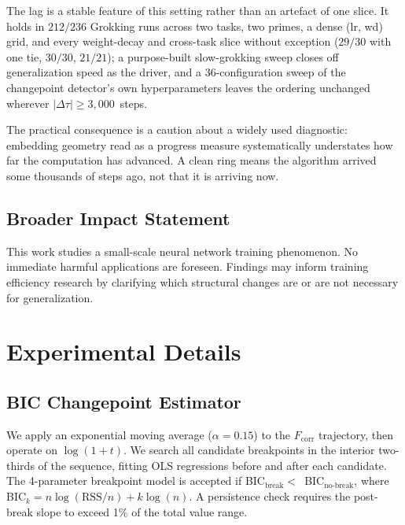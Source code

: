 \documentclass{article}
\newcommand{\Dtau}{\Delta\tau}
\newcommand{\fcorr}{F_{\mathrm{corr}}}
\begin{document}
The lag is a stable feature of this setting rather than an
artefact of one slice.
It holds in $212/236$ Grokking runs across two tasks, two primes,
a dense (lr, wd) grid, and every weight-decay and cross-task
slice without exception ($29/30$ with one tie, $30/30$, $21/21$);
a purpose-built slow-grokking sweep closes off generalization
speed as the driver, and a 36-configuration sweep of the
changepoint detector's own hyperparameters leaves the ordering
unchanged wherever $|\Dtau|\geq3{,}000$~steps.

The practical consequence is a caution about a widely used
diagnostic: embedding geometry read as a progress measure
systematically understates how far the computation has advanced.
A clean ring means the algorithm arrived some thousands of steps
ago, not that it is arriving now.

\subsection*{Broader Impact Statement}

This work studies a small-scale neural network training phenomenon.
No immediate harmful applications are foreseen.
Findings may inform training efficiency research by clarifying which
structural changes are or are not necessary for generalization.




\appendix
\section{Experimental Details}
\label{app:details}

\subsection{BIC Changepoint Estimator}

We apply an exponential moving average ($\alpha{=}0.15$) to the
$\fcorr$ trajectory, then operate on $\log(1+t)$.
We search all candidate breakpoints in the interior two-thirds of
the sequence, fitting OLS regressions before and after each candidate.
The 4-parameter breakpoint model is accepted if BIC$_{\text{break}}
<$~BIC$_{\text{no-break}}$, where BIC$_k = n\log(\text{RSS}/n)
+ k\log(n)$.
A persistence check requires the post-break slope to exceed 1\% of
the total value range.
\end{document}
